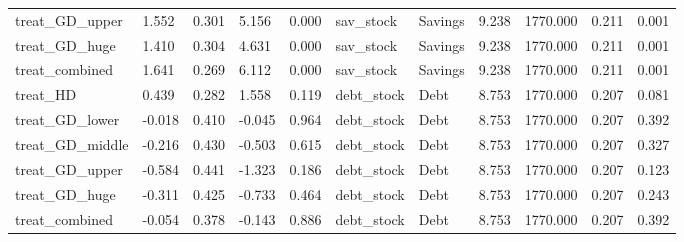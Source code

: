 \begin{tabular}{lllllllllll}
treat\_GD\_upper & 1.552 & 0.301 & 5.156 & 0.000 & sav\_stock & Savings & 9.238 & 1770.000 & 0.211 & 0.001 \\
treat\_GD\_huge & 1.410 & 0.304 & 4.631 & 0.000 & sav\_stock & Savings & 9.238 & 1770.000 & 0.211 & 0.001 \\
treat\_combined & 1.641 & 0.269 & 6.112 & 0.000 & sav\_stock & Savings & 9.238 & 1770.000 & 0.211 & 0.001 \\
treat\_HD & 0.439 & 0.282 & 1.558 & 0.119 & debt\_stock & Debt & 8.753 & 1770.000 & 0.207 & 0.081 \\
treat\_GD\_lower & -0.018 & 0.410 & -0.045 & 0.964 & debt\_stock & Debt & 8.753 & 1770.000 & 0.207 & 0.392 \\
treat\_GD\_middle & -0.216 & 0.430 & -0.503 & 0.615 & debt\_stock & Debt & 8.753 & 1770.000 & 0.207 & 0.327 \\
treat\_GD\_upper & -0.584 & 0.441 & -1.323 & 0.186 & debt\_stock & Debt & 8.753 & 1770.000 & 0.207 & 0.123 \\
treat\_GD\_huge & -0.311 & 0.425 & -0.733 & 0.464 & debt\_stock & Debt & 8.753 & 1770.000 & 0.207 & 0.243 \\
treat\_combined & -0.054 & 0.378 & -0.143 & 0.886 & debt\_stock & Debt & 8.753 & 1770.000 & 0.207 & 0.392 \\
\bottomrule
\end{tabular}
